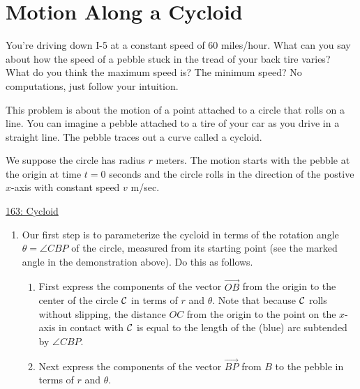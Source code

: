 \documentclass{ximera}
\begin{document}
\section{Motion Along a Cycloid}
\begin{question} \label{Q4950504333}
You're driving down I-5 at a constant speed of $60$ miles/hour. What can you say about how the speed of a pebble stuck in the tread of your back tire varies? What do you think the maximum speed is? The minimum speed? No computations, just follow your intuition.

\begin{freeResponse}
\end{freeResponse}


This problem is about the motion of a point attached to a circle that rolls on a line. You can imagine a pebble attached to a tire of your car as you drive in a straight line. The pebble traces out a curve called a cycloid.

We suppose the circle has radius $r$ meters. The motion starts with the pebble at the origin at time $t=0$ seconds and the circle rolls in the direction of the postive $x$-axis with constant speed $v$ m/sec.

\begin{onlineOnly}
    \begin{center}
\end{center}
\end{onlineOnly}

\href{https://www.geogebra.org/classic/rrzgbtfr}{163: Cycloid}

\begin{enumerate}
\item Our first step is to parameterize the cycloid in terms of the rotation angle $\theta = \angle CBP$ of the circle, measured from its starting point (see the marked angle in the demonstration above). Do this as follows.

\begin{enumerate}
\item First express the components of the vector $\overrightarrow{OB}$ from the origin to the center of the circle ${\cal C}$ in terms of $r$ and $\theta$. Note that because ${\cal C}$ rolls without slipping, the distance $OC$ from the origin to the point on the $x$-axis in contact with ${\cal C}$ is equal to the length of the (blue) arc subtended by $\angle CBP$.

\item Next express the components of the vector $\overrightarrow{BP}$ from $B$ to the pebble in terms of $r$ and $\theta$.


\end{enumerate}
\end{enumerate}
\end{question}
\end{document}
